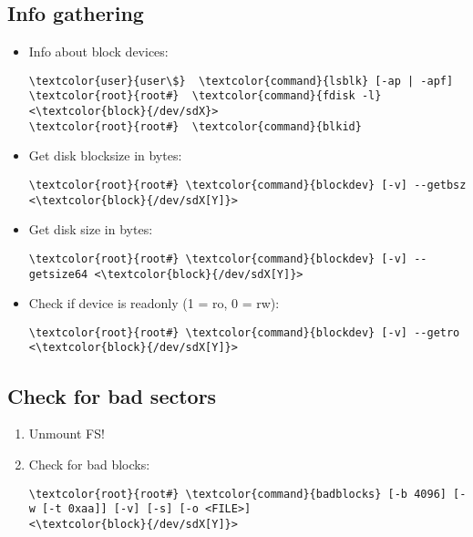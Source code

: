 \documentclass[10pt, a4paper, onecolumn, openany]{book} %
\begin{document}
\subsection{Info gathering}
\begin{itemize}
    \item Info about block devices:
\begin{Verbatim}[commandchars=\\\{\}]
\textcolor{user}{user\$}  \textcolor{command}{lsblk} [-ap | -apf]
\textcolor{root}{root#}  \textcolor{command}{fdisk -l} <\textcolor{block}{/dev/sdX}>
\textcolor{root}{root#}  \textcolor{command}{blkid}
\end{Verbatim}
    \item Get disk blocksize in bytes:
\begin{Verbatim}[commandchars=\\\{\}]
\textcolor{root}{root#} \textcolor{command}{blockdev} [-v] --getbsz <\textcolor{block}{/dev/sdX[Y]}>
\end{Verbatim}
    \item Get disk size in bytes:
\begin{Verbatim}[commandchars=\\\{\}]
\textcolor{root}{root#} \textcolor{command}{blockdev} [-v] --getsize64 <\textcolor{block}{/dev/sdX[Y]}>
\end{Verbatim}
    \item Check if device is readonly (1 = ro, 0 = rw):
\begin{Verbatim}[commandchars=\\\{\}]
\textcolor{root}{root#} \textcolor{command}{blockdev} [-v] --getro <\textcolor{block}{/dev/sdX[Y]}>
\end{Verbatim}
\end{itemize}
\subsection{Check for bad sectors}
\begin{enumerate}
    \item Unmount FS!
    \item Check for bad blocks:
\begin{Verbatim}[commandchars=\\\{\}]
\textcolor{root}{root#} \textcolor{command}{badblocks} [-b 4096] [-w [-t 0xaa]] [-v] [-s] [-o <FILE>] 
<\textcolor{block}{/dev/sdX[Y]}>
\end{Verbatim}
\end{enumerate}
\end{document}
